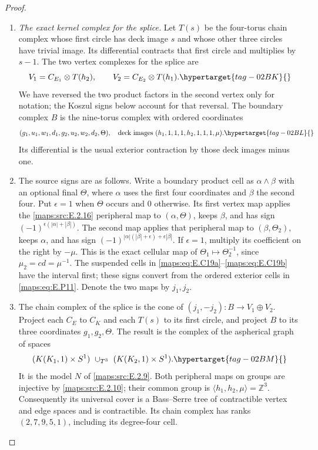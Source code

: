 \documentclass[11pt,a4paper]{article}
\numberwithin{equation}{section}
\theoremstyle{definition}
\begin{document}
\begin{proof}
\begin{enumerate}[label=\arabic*.,leftmargin=*]
\item \emph{The exact kernel complex for the splice.}
Let $T(s)$ be the four-torus chain complex whose
first circle has deck image $s$ and whose other
three circles have trivial image. Its differential
contracts that first circle and multiplies by $s-1$.
The two vertex complexes for the splice are
\begin{equation}
 V_1=C_{E_1}\otimes T(h_2),\qquad
 V_2=C_{E_2}\otimes T(h_1).
 \hypertarget{tag-02BK}{}\label{maps:eq:E.P10}
\end{equation}
We have reversed the two product factors in the
second vertex only for notation; the Koszul signs
below account for that reversal. The boundary
complex $B$ is the nine-torus complex with ordered
coordinates
\begin{equation}
 (g_1,u_1,w_1,d_1,g_2,u_2,w_2,d_2,\Theta),
 \quad\text{deck images }(h_1,1,1,1,h_2,1,1,1,\mu).
 \hypertarget{tag-02BL}{}\label{maps:eq:E.P11}
\end{equation}
Its differential is the usual exterior contraction
by those deck images minus one.

\item The source signs are as follows. Write
a boundary product cell as $\alpha\wedge\beta$
with an optional final $\Theta$, where $\alpha$
uses the first four coordinates and $\beta$ the
second four. Put $\epsilon=1$ when $\Theta$ occurs
and $0$ otherwise. Its first vertex map applies
the \ref{maps:src:E.2.16} peripheral map to $(\alpha,\Theta)$,
keeps $\beta$, and has sign
$(-1)^{\epsilon(|\alpha|+|\beta|)}$.
The second map applies that peripheral map to
$(\beta,\Theta_2)$, keeps $\alpha$, and has sign
$(-1)^{|\alpha|(|\beta|+\epsilon)+\epsilon|\beta|}$.
If $\epsilon=1$, multiply its coefficient on the
right by $-\mu$. This is the exact cellular map
of $\Theta_1\mapsto\Theta_2^{-1}$, since
$\mu_2=cd=\mu^{-1}$. The suspended cells in \eqref{maps:eq:E.C19a}--\eqref{maps:eq:E.C19b}
have the interval first; these signs convert from
the ordered exterior cells in \eqref{maps:eq:E.P11}.
Denote the two maps by $j_1,j_2$.

\item The chain complex of the splice is the cone of
$(j_1,-j_2):B\to V_1\oplus V_2$.
Project each $C_E$ to $C_K$ and each $T(s)$ to its
first circle, and project $B$ to its three coordinates
$g_1,g_2,\Theta$. The result is the complex of the
aspherical graph of spaces
\begin{equation}
 (K(K_1,1)\times S^1)\ \cup_{T^3}\
                         (K(K_2,1)\times S^1).
 \hypertarget{tag-02BM}{}\label{maps:eq:E.P12}
\end{equation}
It is the model $N$ of \ref{maps:src:E.2.9}. Both peripheral maps
on groups are injective by \ref{maps:src:E.2.10}; their common
group is $\langle h_1,h_2,\mu\rangle=\mathbb Z^3$.
Consequently its universal cover is a Bass--Serre
tree of contractible vertex and edge spaces and
is contractible. Its chain complex has ranks
$(2,7,9,5,1)$, including its degree-four cell.


\end{enumerate}
\end{proof}
\end{document}
